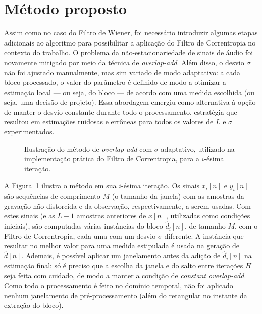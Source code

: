 \section{Método proposto}

Assim como no caso do Filtro de Wiener, foi necessário introduzir algumas etapas
adicionais ao algoritmo para possibilitar a aplicação do Filtro de Correntropia no
contexto do trabalho. O problema da não-estacionariedade de sinais de áudio foi
novamente mitigado por meio da técnica de \textit{overlap-add}. Além disso, o desvio
$\sigma$ não foi ajustado manualmente, mas sim variado de modo adaptativo: a cada bloco
processado, o valor do parâmetro é definido de modo a otimizar a estimação local --- ou
seja, do bloco --- de acordo com uma medida escolhida (ou seja, uma decisão de
projeto). Essa abordagem emergiu como alternativa à opção de manter o desvio constante
durante todo o processamento, estratégia que resultou em estimações ruidosas e errôneas
para todos os valores de $L$ e $\sigma$ experimentados.

\begin{figure}[!ht]
	\centering
	
	\caption[Ilustração do método utilizado para o Filtro de Correntropia]{Ilustração do método de \textit{overlap-add} com $\sigma$ adaptativo, utilizado na implementação prática do Filtro de Correntropia, para a $i$-ésima iteração.}
	\label{fig:correntropy:method}
\end{figure}

A Figura~\ref{fig:correntropy:method} ilustra o método em sua $i$-ésima iteração. Os
sinais $x_i[n]$ e $y_i[n]$ são sequências de comprimento $M$ (o tamanho da janela) com
as amostras da gravação não-distorcida e da observação, respectivamente, a serem
usadas. Com estes sinais (e as $L - 1$ amostras anteriores de $x[n]$, utilizadas como
condições iniciais), são computadas várias instâncias do bloco
$\hat{d}_i[n]$, de tamanho $M$, com o Filtro de Correntropia, cada uma com um
desvio $\sigma$ diferente. A instância que resultar no melhor valor para uma medida
estipulada é usada na geração de $\hat{d}[n]$. Ademais, é possível aplicar um
janelamento antes da adição de $\hat{d}_i[n]$ na estimação final; só é preciso que a
escolha da janela e do salto entre iterações $H$ seja feita com cuidado, de modo a
manter a condição de \textit{constant overlap-add}. Como todo o processamento é feito
no domínio temporal, não foi aplicado nenhum janelamento de pré-processamento (além do
retangular no instante da extração do bloco).

